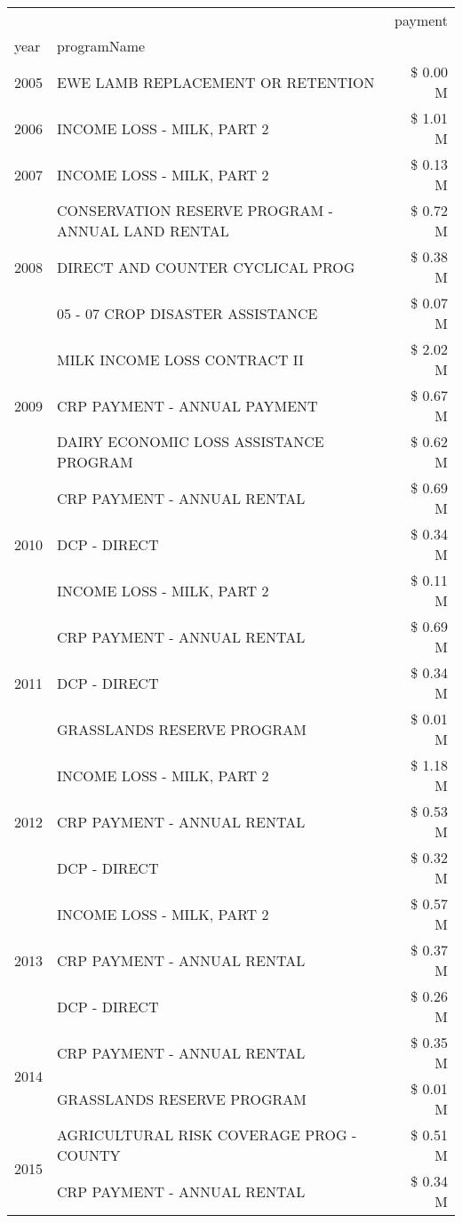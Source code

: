\begin{tabular}{llr}
\toprule
 &  & payment \\
year & programName &  \\
\midrule
2005 & EWE LAMB REPLACEMENT OR RETENTION & \$ 0.00 M \\
\cline{1-3}
2006 & INCOME LOSS - MILK, PART 2 & \$ 1.01 M \\
\cline{1-3}
2007 & INCOME LOSS - MILK, PART 2 & \$ 0.13 M \\
\cline{1-3}
\multirow[t]{3}{*}{2008} & CONSERVATION RESERVE PROGRAM - ANNUAL LAND RENTAL & \$ 0.72 M \\
 & DIRECT AND COUNTER CYCLICAL PROG & \$ 0.38 M \\
 & 05 - 07 CROP DISASTER ASSISTANCE & \$ 0.07 M \\
\cline{1-3}
\multirow[t]{3}{*}{2009} & MILK INCOME LOSS CONTRACT II & \$ 2.02 M \\
 & CRP PAYMENT - ANNUAL PAYMENT & \$ 0.67 M \\
 & DAIRY ECONOMIC LOSS ASSISTANCE PROGRAM & \$ 0.62 M \\
\cline{1-3}
\multirow[t]{3}{*}{2010} & CRP PAYMENT - ANNUAL RENTAL & \$ 0.69 M \\
 & DCP - DIRECT & \$ 0.34 M \\
 & INCOME LOSS - MILK, PART 2 & \$ 0.11 M \\
\cline{1-3}
\multirow[t]{3}{*}{2011} & CRP PAYMENT - ANNUAL RENTAL & \$ 0.69 M \\
 & DCP - DIRECT & \$ 0.34 M \\
 & GRASSLANDS RESERVE PROGRAM & \$ 0.01 M \\
\cline{1-3}
\multirow[t]{3}{*}{2012} & INCOME LOSS - MILK, PART 2 & \$ 1.18 M \\
 & CRP PAYMENT - ANNUAL RENTAL & \$ 0.53 M \\
 & DCP - DIRECT & \$ 0.32 M \\
\cline{1-3}
\multirow[t]{3}{*}{2013} & INCOME LOSS - MILK, PART 2 & \$ 0.57 M \\
 & CRP PAYMENT - ANNUAL RENTAL & \$ 0.37 M \\
 & DCP - DIRECT & \$ 0.26 M \\
\cline{1-3}
\multirow[t]{2}{*}{2014} & CRP PAYMENT - ANNUAL RENTAL & \$ 0.35 M \\
 & GRASSLANDS RESERVE PROGRAM & \$ 0.01 M \\
\cline{1-3}
\multirow[t]{3}{*}{2015} & AGRICULTURAL RISK COVERAGE PROG - COUNTY & \$ 0.51 M \\
 & CRP PAYMENT - ANNUAL RENTAL & \$ 0.34 M \\

\end{tabular}
